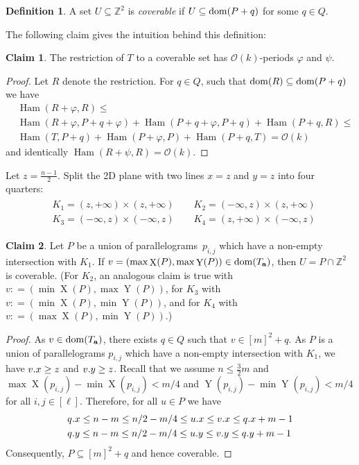 \documentclass[11pt, letterpaper]{article}
\theoremstyle{plain}
\theoremstyle{definition}
\newtheorem{definition}{Definition}
\newtheorem{claim}{Claim}
\theoremstyle{remark}
\newcommand{\Z}{\mathbb{Z}}
\renewcommand{\O}{\mathcal{O}}
\renewcommand{\phi}{\varphi}
\DeclareMathOperator*{\X}{X}
\DeclareMathOperator*{\Y}{Y}
\DeclareMathOperator*{\Ham}{Ham}
\begin{document}
\begin{definition}
A set $U \subseteq \Z^2$ is \emph{coverable} if $U \subseteq \operatorname*{dom}(P + q)$ for some $q \in Q$.
\end{definition}

The following claim gives the intuition behind this definition:

\begin{claim}\label{coverable is periodic}
	The restriction of $T$ to a coverable set has $\O(k)$-periods $\phi$ and $\psi$.
\end{claim}	
	\begin{proof}
		Let $R$ denote the restriction. For $q \in Q$, such that $\operatorname*{dom}(R) \subseteq \operatorname*{dom}(P + q)$ we have
\begin{align*}
&\Ham(R + \phi, R) \le \\
&\Ham(R + \phi, P + q + \phi) + \Ham(P + q + \phi, P + q) + \Ham(P + q, R) \le \\
&\Ham(T, P + q) + \Ham(P + \phi, P) + \Ham(P + q, T) = \O(k)
\end{align*}
and identically $\Ham(R + \psi, R) = \O(k)$.
\end{proof}

Let $z = \frac{n - 1}{2}$. Split the 2D plane with two lines $x = z$ and $y = z$ into four quarters:
\begin{align}
\label{eq:quarters}
\begin{split}
&K_1 = (z, +\infty) \times (z, +\infty) \quad\quad K_2 = (-\infty, z) \times (z, +\infty)\\
&K_3 = (-\infty, z) \times (-\infty, z) \quad\quad K_4 = (z, +\infty) \times (-\infty, z)
\end{split}
\end{align}


\newcommand{\I}{\mathcal{I}}
\newcommand{\G}{\mathcal{G}}
\newcommand{\C}{\mathcal{C}}

\begin{claim}\label{coverable}
Let $P$ be a union of parallelograms~$p_{i,j}$ which have a non-empty intersection with $K_1$. If $v = (\max \X(P), \max \Y(P)) \in \d{\Ta}$, then $U = P \cap \Z^2$ is coverable. (For $K_2$, an analogous claim is true with $v: = (\min \X(P), \max \Y(P))$, for $K_3$ with $v : = (\min \X(P), \min \Y(P))$, and for $K_4$ with $v : = (\max \X(P), \min \Y(P))$.)
\end{claim}
\begin{proof}
As $v \in \operatorname*{dom}(T_\mathbf{a})$, there exists $q \in Q$ such that $v \in [m]^2 + q$. As $P$ is a union of parallelograms $p_{i,j}$ which have a non-empty intersection with $K_1$, we have $v.x \ge z$ and $v.y \ge z$. Recall that we assume $n \le \frac{3}{2} m$ and $\max \X(p_{i, j}) - \min \X(p_{i, j}) < m / 4$ and $\Y(p_{i, j}) - \min \Y(p_{i, j}) < m / 4$ for all $i, j \in [\ell]$. Therefore, for all $u \in P$ we have
\begin{align*}
&q.x \le n-m \le n/2-m/4 \le u.x \le v.x \le q.x + m-1\\
&q.y \le n-m \le n/2-m/4 \le u.y \le v.y \le q.y + m-1 
\end{align*}
\noindent Consequently, $P \subseteq [m]^2+q$ and hence coverable.
\end{proof}
\end{document}
